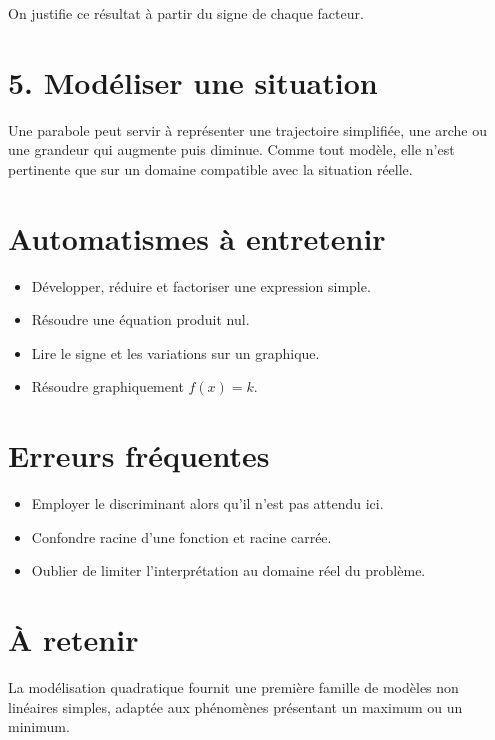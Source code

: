 On justifie ce résultat à partir du signe de chaque facteur.

\section{5. Modéliser une situation}
Une parabole peut servir à représenter une trajectoire simplifiée, une arche ou une grandeur qui augmente puis diminue. Comme tout modèle, elle n'est pertinente que sur un domaine compatible avec la situation réelle.

\section{Automatismes à entretenir}
\begin{itemize}
\item Développer, réduire et factoriser une expression simple.
\item Résoudre une équation produit nul.
\item Lire le signe et les variations sur un graphique.
\item Résoudre graphiquement $f(x)=k$.
\end{itemize}

\section{Erreurs fréquentes}
\begin{itemize}
\item Employer le discriminant alors qu'il n'est pas attendu ici.
\item Confondre racine d'une fonction et racine carrée.
\item Oublier de limiter l'interprétation au domaine réel du problème.
\end{itemize}

\section{À retenir}
La modélisation quadratique fournit une première famille de modèles non linéaires simples, adaptée aux phénomènes présentant un maximum ou un minimum.

